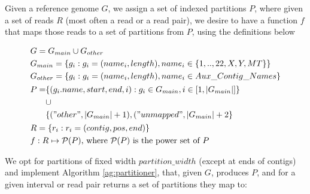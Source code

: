 Given a reference genome $G$, we assign a set of indexed partitions $P$, where given a set of reads $R$ (most often a read or a read pair), we desire to have a function $f$ that maps those reads to a set of partitions from $P$, using the definitions below

\begin{align*}
    &G = G_{main} \cup G_{other}\\
    &G_{main} = \{g_i: g_i = (name_i, length), name_i \in \{1,..,22,X,Y,MT\}\}\\
    &G_{other} = \{g_i: g_i = (name_i, length), name_i \in Aux\_Contig\_Names\}\\
    &\begin{aligned}P = &\{(g_i.name, start, end, i) : g_i \in G_{main}, i \in [1,|G_{main}|]\} \\
   & \cup\\ 
    &\{("other",|G_{main}|+1), ("unmapped",|G_{main}|+2\}\\
    \end{aligned}\\
    &R = \{r_i: r_i = (contig, pos, end)\}\\
    &f:R \mapsto \mathcal{P}(P)\text{, where }\mathcal{P}(P)\text{ is the power set of }P
\end{align*}

We opt for partitions of fixed width $partition\_width$ (except at ends of contigs) and implement Algorithm \ref{ag:partitioner}, that, given $G$, produces $P$, and for a given interval or read pair returns a set of partitions they map to:

